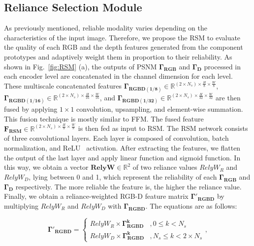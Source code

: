 \documentclass[runningheads]{llncs}
\begin{document}
	\subsection{Reliance Selection Module}
	\label{RSM}
	As previously mentioned, reliable modality varies depending on the characteristics of the input image. Therefore, we propose the RSM to evaluate the quality of each RGB and the depth features generated from the component prototypes and adaptively weight them in proportion to their reliability. As shown in Fig.~\ref{fig:RSM} (a), the outputs of PSNM $\mathbf{\Gamma_{RGB}}$ and $\mathbf{\Gamma_D}$ processed in each encoder level are concatenated in the channel dimension for each level. These multiscale concatenated features $\mathbf{\Gamma _ {RGBD \left ( 1/8 \right ) }} \in \mathbb{R} ^ {\left( 2\times N_s \right)\times \frac{ H } { 8 } \times \frac{ W } { 8 }}$, $\mathbf{\Gamma _ {RGBD \left ( 1/16 \right ) }} \in \mathbb{R} ^ {\left( 2\times N_s \right)\times \frac{ H } { 16 } \times \frac{ W } { 16 }}$, and $\mathbf{\Gamma _ {RGBD \left ( 1/32 \right ) }} \in \mathbb{R} ^ {\left( 2\times N_s \right)\times \frac{ H } { 32 } \times \frac{ W } { 32 }}$ are then fused by applying $1\times 1$ convolution, upsampling, and element-wise summation. This fusion technique is mostly similar to FFM. The fused feature $\mathbf{F _ {RSM}} \in \mathbb{R} ^ {\left( 2\times N_s \right)\times \frac{ H } { 8 } \times \frac{ W } { 8 }}$ is then fed as input to RSM. The RSM network consists of three convolutional layers. Each layer is composed of convolution, batch normalization, and ReLU~\cite{agarap2018deep} activation. After extracting the features, we flatten the output of the last layer and apply linear function and sigmoid function. In this way, we obtain a vector $\mathbf{RelyW}\in \mathbb{R} ^ {2}$ of two reliance values $RelyW_{R}$ and $RelyW_{D}$, lying between 0 and 1, which represent the reliability of each $\mathbf{\Gamma_{RGB}}$ and $\mathbf{\Gamma_D}$ respectively. The more reliable the feature is, the higher the reliance value. Finally, we obtain a reliance-weighted RGB-D feature matrix $\mathbf{\Gamma' _ {RGBD}}$ by multiplying $RelyW_{R}$ and $RelyW_{D}$ with $\mathbf{\Gamma _ {RGBD}}$. The equations are as follows:
	
	\begin{equation}
		\mathbf{\Gamma' _ {RGBD}} = \begin{cases} RelyW_R \times \mathbf{\Gamma_{RGBD} ^ { k }} & , 0 \leq k < N_s  \\ RelyW_D \times \mathbf{\Gamma_{RGBD} ^ { k }} & , N_s \leq k < 2 \times N_s \end{cases},
	\end{equation}
	
\end{document}

